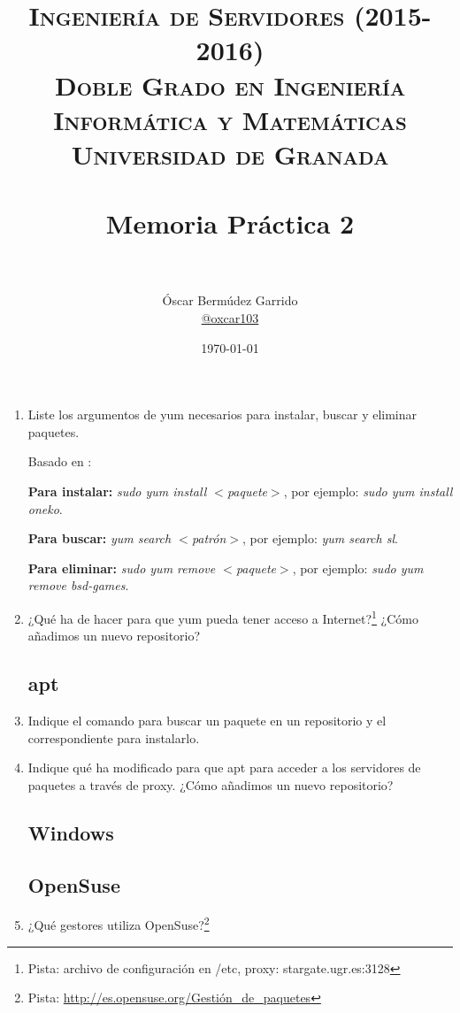 \documentclass[paper=a4, fontsize=11pt]{scrartcl} %
\title{	
\normalfont \normalsize 
\textsc{{\bf Ingeniería de Servidores (2015-2016)} \\ Doble Grado en Ingeniería Informática y Matemáticas \\ Universidad de Granada} \\ [25pt] %
\horrule{0.5pt} \\[0.4cm] %
\huge Memoria Práctica 2 \\ %
\horrule{2pt} \\[0.5cm] %
}
\author{Óscar Bermúdez Garrido\\ \href{http://www.github.com/oxcar103}{@oxcar103}} %
\date{\normalsize\today} %
\numberwithin{equation}{section} %
\numberwithin{figure}{section} %
\numberwithin{table}{section} %
\begin{document}
\maketitle %
\newpage %
\tableofcontents %
\listoffigures

\begin{enumerate}
	\section{Instalación de servicios y configuración}
	\subsection{yum}
	\item Liste los argumentos de yum necesarios para instalar, buscar y eliminar paquetes.
	
	Basado en \cite{man_yum}:
	
	\textbf{Para instalar:} \textit{sudo yum install $<$paquete$>$}, por ejemplo: \textit{sudo yum
	install oneko}.
	
	\textbf{Para buscar:} \textit{yum search $<$patrón$>$}, por ejemplo: \textit{yum search sl}.
	
	\textbf{Para eliminar:} \textit{sudo yum remove $<$paquete$>$}, por ejemplo: \textit{sudo yum
	remove bsd-games}.
	
	
	\item ¿Qué ha de hacer para que yum pueda tener acceso a Internet?\footnote{Pista: archivo de
	configuración en /etc, proxy: stargate.ugr.es:3128} ¿Cómo añadimos un nuevo repositorio?
	
	\subsection{apt}
	\item Indique el comando para buscar un paquete en un repositorio y el correspondiente para instalarlo.

	\item Indique qué ha modificado para que apt para acceder a los servidores de paquetes a través de
	proxy. ¿Cómo añadimos un nuevo repositorio?
	
	\subsection{Windows}
	\subsection{OpenSuse}
	\item ¿Qué gestores utiliza OpenSuse?\footnote{Pista: \url{http://es.opensuse.org/Gestión_de_paquetes}}
	

\end{enumerate}
\end{document}
